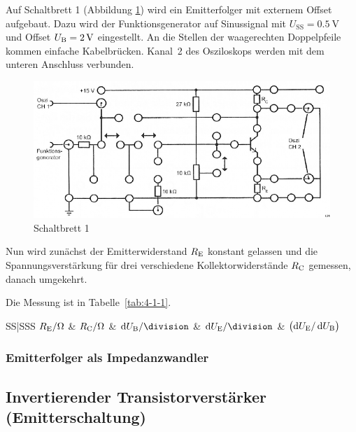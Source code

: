 Auf Schaltbrett 1 (Abbildung \ref{fig:3-4}) wird ein Emitterfolger mit
externem Offset aufgebaut. Dazu wird der Funktionsgenerator auf Sinussignal mit
$U_\text{SS} = \SI{0.5}{\volt}$ und Offset $\UB = \SI 2{\volt}$ eingestellt. An
die Stellen der waagerechten Doppelpfeile kommen einfache Kabelbrücken. Kanal~2
des Osziloskops werden mit dem unteren Anschluss verbunden.

\begin{figure}
	\centering
	\includegraphics[width=\textwidth]{Anleitung/3-4.png}
	\caption{%
		Schaltbrett 1
	}
	\label{fig:3-4}
\end{figure}

Nun wird zunächst der Emitterwiderstand $\RE$ konstant gelassen und die
Spannungsverstärkung für drei verschiedene Kollektorwiderstände $\RC$ gemessen,
danach umgekehrt.

Die Messung ist in Tabelle~\ref{tab:4-1-1}.

\begin{table}
	\centering
	\begin{tabular}{SS|SSS}
		{$\RE / \si{\ohm}$} & {$\RC / \si{\ohm}$} & {$\dif\UB / \si{\division}$}
		& {$\dif\UE / \si{\division}$} & {$\del{\dif\UE / \dif\UB}$} \\
		\hline
	\end{tabular}
	\caption{%
		Abhängigkeit der Spannungsverstärkung von $\RE$ und $\RC$
	}
\label{tab:4-1-1}
\end{table}


\subsubsection{Emitterfolger als Impedanzwandler}

\fehlt

\subsection{Invertierender Transistorverstärker (Emitterschaltung)}

